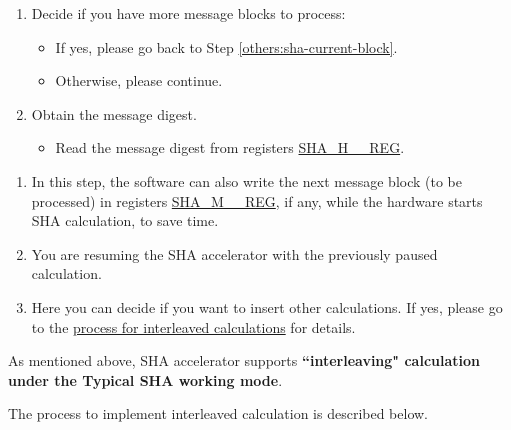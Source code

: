 \documentclass[main\_\_EN.tex]{subfiles}
\begin{document}
\begin{enumerate}
    \item Decide if you have more message blocks to process:
    \begin{itemize}
        \item If yes, please go back to Step \ref{others:sha-current-block}.
        \item Otherwise, please continue.
    \end{itemize}

    \item Obtain the message digest.
    \begin{itemize}
        \item Read the message digest from registers \hyperref[regdesc:SHAHNREG]{SHA\_H\_\_REG}.
    \end{itemize}
\end{enumerate}
  
\begin{tiplisting}\label{others:sha-note-typical-sha}
\vspace{-2.5em}
\begin{enumerate}
\item In this step, the software can also write the next message block (to be processed) in registers \hyperref[regdesc:SHAMNREG]{SHA\_M\_\_REG}, if any, while the hardware starts SHA calculation, to save time.
\item You are resuming the SHA accelerator with the previously paused calculation.
\item Here you can decide if you want to insert other calculations. If yes, please go to the \hyperref[others:sha-interleaved]{process for interleaved calculations} for details.
\end{enumerate} 
\end{tiplisting}

\label{others:sha-interleaved}As mentioned above, \chipname{} SHA accelerator supports \textbf{``interleaving" calculation under the Typical SHA working mode}. 

The process to implement interleaved calculation is described below.
\end{document}
